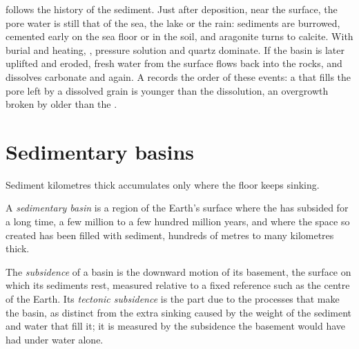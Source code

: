  follows the history of the sediment. Just after deposition, near the
surface, the pore water is still that of the sea, the lake or the rain:
sediments are burrowed, cemented early on the sea floor or in the soil, and
aragonite turns to calcite. With burial and heating, , pressure
solution and quartz  dominate. If the basin is
later uplifted and eroded, fresh water from the surface flows back into the
rocks, and dissolves carbonate and  again. A  records the
order of these events: a  that fills the pore left by a dissolved grain is
younger than the dissolution, an overgrowth broken by  older than the
.

\section{Sedimentary basins}\label{sec:b1:diagenesis-basins:basins}

Sediment kilometres thick accumulates only where the floor keeps sinking.

\begin{definition}\label{def:b1:diagenesis-basins:basin}
A \emph{sedimentary basin} is a region of the Earth's
surface where the  has subsided for a long time, a few million to a few
hundred million years, and where the space so created has been filled with
sediment, hundreds of metres to many kilometres thick.
\end{definition}

\begin{definition}\label{def:b1:diagenesis-basins:subsidence}
The \emph{subsidence} of a basin is the downward motion of its
basement, the surface on which its sediments rest, measured relative to a fixed
reference such as the centre of the Earth. Its \emph{tectonic
subsidence} is the part due to the processes that
make the basin, as distinct from the extra sinking caused by the weight of the
sediment and water that fill it; it is measured by the subsidence the basement
would have had under water alone.
\end{definition}


